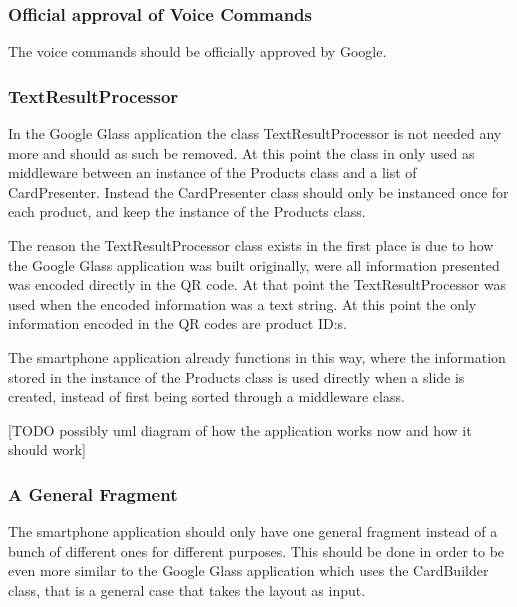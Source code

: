 \subsubsection{Official approval of Voice Commands}
The voice commands should be officially approved by Google.

\subsubsection{TextResultProcessor}
In the Google Glass application the class TextResultProcessor is not needed any more and should as such be removed. At this point the class in only used as middleware between an instance of the Products class and a list of CardPresenter. Instead the CardPresenter class should only be instanced once for each product, and keep the instance of the Products class.

The reason the TextResultProcessor class exists in the first place is due to how the Google Glass application was built originally, were all information presented was encoded directly in the QR code. At that point the TextResultProcessor was used when the encoded information was a text string. At this point the only information encoded in the QR codes are product ID:s.

The smartphone application already functions in this way, where the information stored in the instance of the Products class is used directly when a slide is created, instead of first being sorted through a middleware class.

[TODO possibly uml diagram of how the application works now and how it should work]

\subsubsection{A General Fragment}
The smartphone application should only have one general fragment instead of a bunch of different ones for different purposes. This should be done in order to be even more similar to the Google Glass application which uses the CardBuilder class, that is a general case that takes the layout as input.